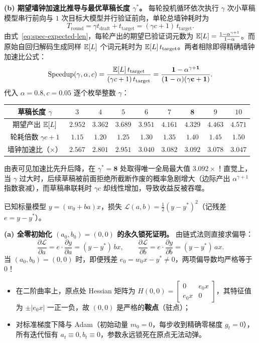 \textbf{(b) 期望墙钟加速比推导与最优草稿长度 $\gamma^*$。} 每轮投机循环依次执行 $\gamma$ 次小草稿模型串行前向与 $1$ 次目标大模型并行验证前向，单轮总墙钟耗时为
\[
  T_{\mathrm{round}} = \gamma t_{\mathrm{draft}} + t_{\mathrm{target}} = (\gamma c + 1)\,t_{\mathrm{target}}.
\]
由式~\eqref{eq:spec-expected-len}，每轮产出的期望已验证词元数为 $\mathbb{E}[L] = \frac{1 - \alpha^{\gamma + 1}}{1 - \alpha}$。而原始自回归解码生成同样 $\mathbb{E}[L]$ 个词元耗时为 $\mathbb{E}[L]\,t_{\mathrm{target}}$。两者相除即得精确墙钟加速比公式：
\[
  \mathrm{Speedup}(\gamma, \alpha, c)
  = \frac{\mathbb{E}[L]\,t_{\mathrm{target}}}{(\gamma c + 1)\,t_{\mathrm{target}}}
  = \mathbf{\frac{1 - \alpha^{\gamma + 1}}{(1 - \alpha)(\gamma c + 1)}}.
\]
代入 $\alpha = 0.8, c = 0.05$ 逐个枚举整数 $\gamma$：
\begin{center}
\footnotesize
\begin{tabular}{ccccccccc}
\toprule
草稿长度 $\gamma$ & $3$ & $4$ & $5$ & $6$ & $7$ & $\mathbf{8}$ & $9$ & $10$ \\
\midrule
期望产出 $\mathbb{E}[L]$ & $2.952$ & $3.362$ & $3.689$ & $3.951$ & $4.161$ & $\mathbf{4.329}$ & $4.463$ & $4.571$ \\
轮耗倍数 $\gamma c + 1$ & $1.15$ & $1.20$ & $1.25$ & $1.30$ & $1.35$ & $\mathbf{1.40}$ & $1.45$ & $1.50$ \\
墙钟加速比（$\times$） & $2.567$ & $2.801$ & $2.951$ & $3.040$ & $3.082$ & $\mathbf{3.092}$ & $3.078$ & $3.047$ \\
\bottomrule
\end{tabular}
\end{center}
由表可见加速比先升后降，在 $\gamma^* = \mathbf{8}$ 处取得唯一全局最大值 $\mathbf{3.092\times}$！直觉上，当 $\gamma$ 过大时，后续草稿被前面拒绝所截断作废的概率急剧增大（边际产出 $\alpha^{\gamma+1}$ 指数衰减），而草稿串联耗时 $\gamma c$ 却线性增加，导致收益反被吞噬。


已知标量模型 $y = (w_0 + b a)x$，损失 $\mathcal{L}(a, b) = \frac{1}{2}(y - y^*)^2$（记残差 $e = y - y^*$）。

\textbf{(a) 全零初始化 $(a_0, b_0) = (0, 0)$ 的永久锁死证明。} 由链式法则直接求偏导：
\[
  \frac{\partial \mathcal{L}}{\partial a} = e \cdot \frac{\partial y}{\partial a} = (y - y^*)\,b x, \qquad
  \frac{\partial \mathcal{L}}{\partial b} = e \cdot \frac{\partial y}{\partial b} = (y - y^*)\,a x.
\]
当 $(a_0, b_0) = (0, 0)$ 时，即便残差 $e_0 = w_0 x - y^* \neq 0$，两项偏导数均严格等于 $0$！
\begin{itemize}
  \item 在二阶曲率上，原点处 Hessian 矩阵为 $H(0, 0) = \begin{bmatrix} 0 & e_0 x \\ e_0 x & 0 \end{bmatrix}$，其特征值为 $\pm |e_0 x|$ 一正一负，故 $(0, 0)$ 是严格的\textbf{鞍点}（驻点）；
  \item 对标准梯度下降与 Adam（初始动量 $m_0 = 0$，每步收到精确零梯度 $g_t = 0$），所有迭代恒有 $a_t \equiv 0, b_t \equiv 0$，参数永远锁死在原点无法动弹。
\end{itemize}

